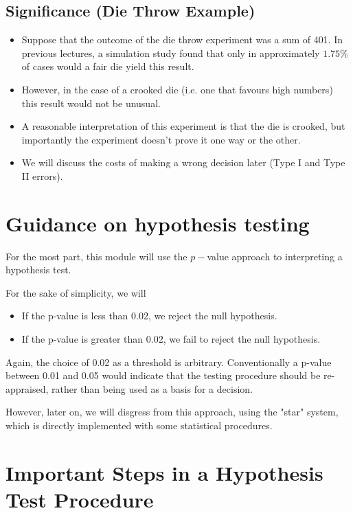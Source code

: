 \documentclass[]{report}
\begin{document}
{{{\subsection{Significance (Die Throw Example)}
\begin{itemize}
\item Suppose that the outcome of the die throw experiment was a sum of 401. In previous lectures, a simulation study found that only in approximately $1.75\%$ of cases would a fair die yield this result.
\item However, in the case of a crooked die (i.e. one that favours high numbers) this result would not be unusual.
\item A reasonable interpretation of this experiment is that the die is crooked, but importantly the experiment doesn't prove it one way or the other.
\item We will discuss the costs of making a wrong decision later (Type I and Type II errors).
\end{itemize}












\section{Guidance on hypothesis testing}

For the most part, this module will use the $p-$value approach to interpreting a hypothesis test.

For the sake of simplicity, we will 
\begin{itemize}
\item If the p-value is less than 0.02, we reject the null hypothesis.
\item If the p-value is greater than 0.02, we fail to reject the null hypothesis.
\end{itemize}

Again, the choice of 0.02 as a threshold is arbitrary. Conventionally a p-value between 0.01 and 0.05 would 
indicate that the testing procedure should be re-appraised, rather than being used as a basis for a decision.

However, later on, we will disgress from this approach, using the "star" system, which is directly implemented 
with some statistical procedures.



\section*{Important Steps in a Hypothesis Test Procedure}




}}}
\end{document}
